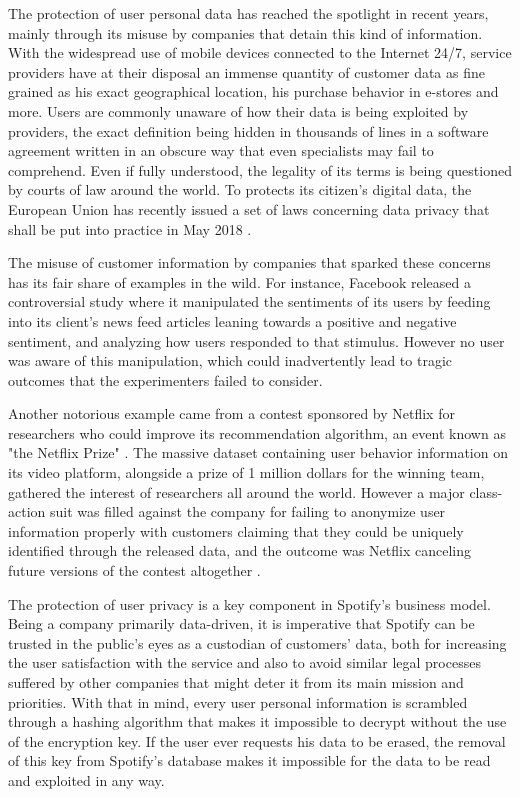 \documentclass{kththesis}
\begin{document}
The protection of user personal data has reached the spotlight in recent years, mainly through its misuse by companies that detain this kind of information. With the widespread use of mobile devices connected to the Internet 24/7, service providers have at their disposal an immense quantity of customer data as fine grained as his exact geographical location, his purchase behavior in e-stores and more. Users are commonly unaware of how their data is being exploited by providers, the exact definition being hidden in thousands of lines in a software agreement written in an obscure way that even specialists may fail to comprehend. Even if fully understood, the legality of its terms is being questioned by courts of law around the world. To protects its citizen's digital data, the European Union has recently issued a set of laws concerning data privacy that shall be put into practice in May 2018 \citep{eu2017protection}.

The misuse of customer information by companies that sparked these concerns has its fair share of examples in the wild. For instance, Facebook released a controversial study where it manipulated the sentiments of its users by feeding into its client's news feed articles leaning towards a positive and negative sentiment, and analyzing how users responded to that stimulus\citep{kramer2014experimental}. However no user was aware of this manipulation, which could inadvertently lead to tragic outcomes that the experimenters failed to consider. 

Another notorious example came from a contest sponsored by Netflix for researchers who could improve its recommendation algorithm, an event known as "the Netflix Prize" \citep{bennett2007netflix}. The massive dataset containing user behavior information on its video platform, alongside a prize of 1 million dollars for the winning team, gathered the interest of researchers all around the world. However a major class-action suit was filled against the company for failing to anonymize user information properly with customers claiming that they could be uniquely identified through the released data, and the outcome was Netflix canceling future versions of the contest altogether \citep{wired2010netflix}.

The protection of user privacy is a key component in Spotify's business model. Being a company primarily data-driven, it is imperative that Spotify can be trusted in the public's eyes as a custodian of customers' data, both for increasing the user satisfaction with the service and also to avoid similar legal processes suffered by other companies that might deter it from its main mission and priorities. With that in mind, every user personal information is scrambled through a hashing algorithm that makes it impossible to decrypt without the use of the encryption key. If the user ever requests his data to be erased, the removal of this key from Spotify's database makes it impossible for the data to be read and exploited in any way. 
\end{document}
